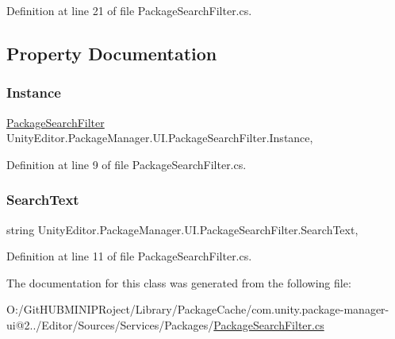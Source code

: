 Definition at line 21 of file Package\+Search\+Filter.\+cs.



\subsection{Property Documentation}
\mbox{\label{class_unity_editor_1_1_package_manager_1_1_u_i_1_1_package_search_filter_aad55f0a0081312f0bded8426819e1f30}} 
\subsubsection{\texorpdfstring{Instance}{Instance}}
{\footnotesize\ttfamily \mbox{\hyperlink{class_unity_editor_1_1_package_manager_1_1_u_i_1_1_package_search_filter}{Package\+Search\+Filter}} Unity\+Editor.\+Package\+Manager.\+U\+I.\+Package\+Search\+Filter.\+Instance\hspace{0.3cm}{\ttfamily [static]}, {\ttfamily [get]}}



Definition at line 9 of file Package\+Search\+Filter.\+cs.

\mbox{\label{class_unity_editor_1_1_package_manager_1_1_u_i_1_1_package_search_filter_a7db2d94e9048fca9990339590e889e69}} 
\subsubsection{\texorpdfstring{SearchText}{SearchText}}
{\footnotesize\ttfamily string Unity\+Editor.\+Package\+Manager.\+U\+I.\+Package\+Search\+Filter.\+Search\+Text\hspace{0.3cm}{\ttfamily [get]}, {\ttfamily [set]}}



Definition at line 11 of file Package\+Search\+Filter.\+cs.



The documentation for this class was generated from the following file\+:\begin{DoxyCompactItemize}
\item 
O\+:/\+Git\+H\+U\+B\+M\+I\+N\+I\+P\+Roject/\+Library/\+Package\+Cache/com.\+unity.\+package-\/manager-\/ui@2../\+Editor/\+Sources/\+Services/\+Packages/\mbox{\hyperlink{_package_search_filter_8cs}{Package\+Search\+Filter.\+cs}}\end{DoxyCompactItemize}
